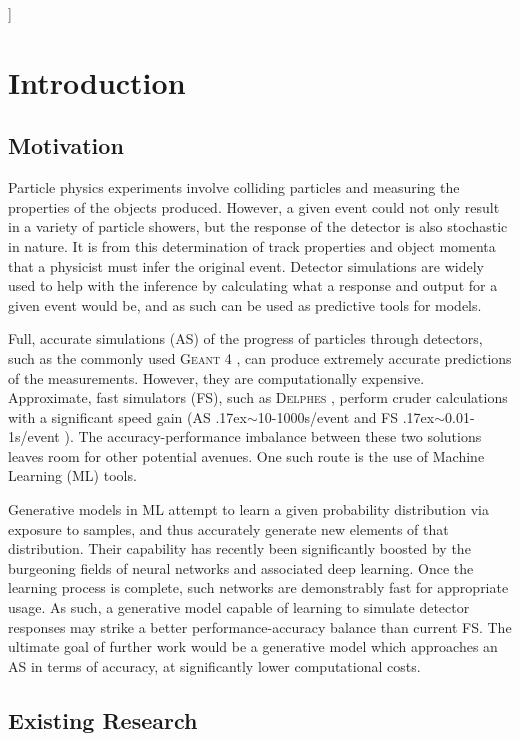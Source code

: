 \documentclass[twocolumn]{article}
\newcommand{\pkg}[1]{\textsc{#1}}
\newcommand{\around}{{\raise.17ex\hbox{$\scriptstyle\sim$}}}
\begin{document}
]



\clearpage
\section{Introduction}

\subsection{Motivation}
Particle physics experiments involve colliding particles and measuring the properties of the objects produced. However, a given event could not only result in a variety of particle showers, but the response of the detector is also stochastic in nature. It is from this determination of track properties and object momenta that a physicist must infer the original event. Detector simulations are widely used to help with the inference by calculating what a response and output for a given event would be, and as such can be used as predictive tools for models.

Full, accurate simulations (AS) of the progress of particles through detectors, such as the commonly used \pkg{Geant} 4 \cite{geant4}, can produce extremely accurate predictions of the measurements. However, they are computationally expensive. Approximate, fast simulators (FS), such as \pkg{Delphes} \cite{delphes}, perform cruder calculations with a significant speed gain (AS \around10-1000s/event and FS \around0.01-1s/event \cite{delphessl}). The accuracy-performance imbalance between these two solutions leaves room for other potential avenues. One such route is the use of Machine Learning (ML) tools.

Generative models in ML attempt to learn a given probability distribution via exposure to samples, and thus accurately generate new elements of that distribution. Their capability has recently been significantly boosted by the burgeoning fields of neural networks and associated deep learning. Once the learning process is complete, such networks are demonstrably fast for appropriate usage. As such, a generative model capable of learning to simulate detector responses may strike a better performance-accuracy balance than current FS. The ultimate goal of further work would be a generative model which approaches an AS in terms of accuracy, at significantly lower computational costs.

\subsection{Existing Research}
\end{document}
